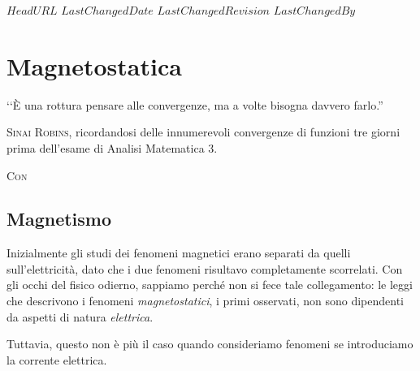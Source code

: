 \svnidlong
{$HeadURL$}
{$LastChangedDate$}
{$LastChangedRevision$}
{$LastChangedBy$}

\chapter{Magnetostatica}

\begin{introduction}
	‘‘È una rottura pensare alle convergenze, ma a volte bisogna davvero farlo.''
	\begin{flushright}
		\textsc{Sinai Robins,} ricordandosi delle innumerevoli convergenze di funzioni tre giorni prima dell'esame di Analisi Matematica 3.
	\end{flushright}
\end{introduction}
\lettrine[findent=1pt, nindent=0pt]{C}{on}
\section{Magnetismo}
Inizialmente  gli studi dei fenomeni magnetici erano separati da quelli sull'elettricità, dato che i due fenomeni risultavo completamente scorrelati. Con gli occhi del fisico odierno, sappiamo perché non si fece tale collegamento: le leggi che descrivono i fenomeni \textit{magnetostatici}, i primi osservati, non sono dipendenti da aspetti di natura \textit{elettrica}.

Tuttavia, questo non è più il caso quando consideriamo fenomeni se introduciamo la corrente elettrica.